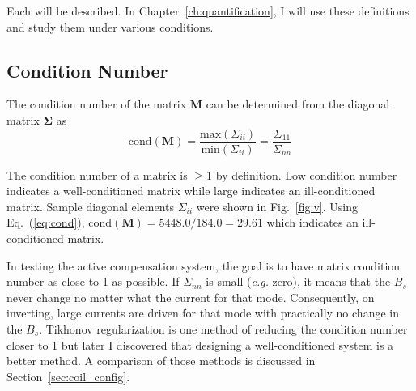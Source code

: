 Each will be described. In Chapter~\ref{ch:quantification}, I will use these definitions and study them under various conditions.

\subsection{Condition Number}


The condition number of the matrix $\bm{M}$ can be determined from the diagonal matrix $\bm{\Sigma}$ as 
 \begin{equation}\label{eq:cond}
     \mathrm{cond}(\bm{M})=\frac{\mathrm{max}(\Sigma_{ii})}{\mathrm{min}(\Sigma_{ii})}=\frac{\Sigma_{11}}{\Sigma_{nn}}
 \end{equation}

The condition number of a matrix is $\geq$1 by definition. Low condition number indicates a well-conditioned matrix while large indicates an ill-conditioned matrix. Sample diagonal elements $\Sigma_{ii}$ were shown in Fig.~\ref{fig:v}. Using Eq.~(\ref{eq:cond}),  $\mathrm{cond}(\bm{M})=5448.0/184.0=29.61$ which indicates an ill-conditioned matrix. 


In testing the active compensation system, the goal is to have matrix condition number as close to 1 as possible. If $\Sigma_{nn}$ is small ({\it e.g.} zero), it means that the $B_s$ never change no matter what the current for that mode. Consequently, on inverting, large currents are driven for that mode with practically no change in the $B_s$. Tikhonov regularization is one method of reducing the condition number closer to 1 but later I discovered that designing a well-conditioned system is a better method. A comparison of those methods is discussed in Section~\ref{sec:coil_config}.

